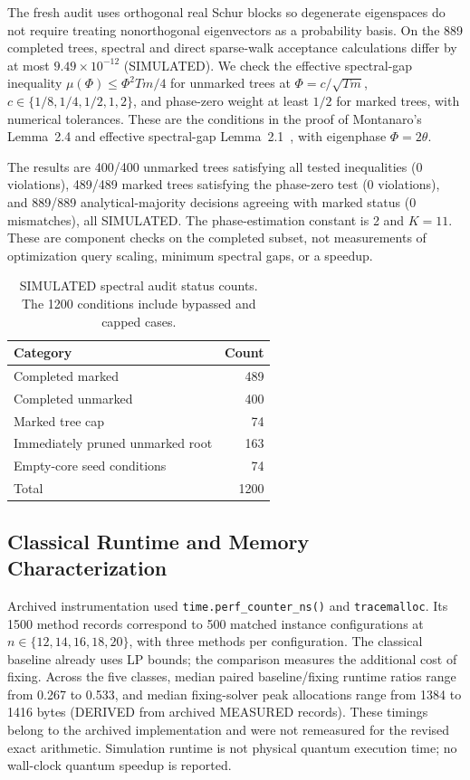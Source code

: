 \documentclass[pdflatex,sn-mathphys-num]{sn-jnl}
\begin{document}
The fresh audit uses orthogonal real Schur blocks so degenerate eigenspaces do not require treating nonorthogonal eigenvectors as a probability basis. On the 889 completed trees, spectral and direct sparse-walk acceptance calculations differ by at most $9.49\times10^{-12}$ (SIMULATED). We check the effective spectral-gap inequality $\mu(\Phi)\le\Phi^2Tm/4$ for unmarked trees at $\Phi=c/\sqrt{Tm}$, $c\in\{1/8,1/4,1/2,1,2\}$, and phase-zero weight at least $1/2$ for marked trees, with numerical tolerances. These are the conditions in the proof of Montanaro's Lemma~2.4 and effective spectral-gap Lemma~2.1~\cite{ref35}, with eigenphase $\Phi=2\theta$.

The results are 400/400 unmarked trees satisfying all tested inequalities (0 violations), 489/489 marked trees satisfying the phase-zero test (0 violations), and 889/889 analytical-majority decisions agreeing with marked status (0 mismatches), all SIMULATED. The phase-estimation constant is 2 and $K=11$. These are component checks on the completed subset, not measurements of optimization query scaling, minimum spectral gaps, or a speedup.

\begin{table}[t]
\caption{SIMULATED spectral audit status counts. The 1200 conditions include bypassed and capped cases.}
\label{tab:measured}
\centering
\begin{tabular}{lr}
\toprule
Category & Count \\
\midrule
Completed marked & 489 \\
Completed unmarked & 400 \\
Marked tree cap & 74 \\
Immediately pruned unmarked root & 163 \\
Empty-core seed conditions & 74 \\
\midrule
Total & 1200 \\
\bottomrule
\end{tabular}
\end{table}


\subsection{Classical Runtime and Memory Characterization}
Archived instrumentation used \texttt{time.perf\_counter\_ns()} and \texttt{tracemalloc}. Its 1500 method records correspond to 500 matched instance configurations at $n\in\{12,14,16,18,20\}$, with three methods per configuration. The classical baseline already uses LP bounds; the comparison measures the additional cost of fixing. Across the five classes, median paired baseline/fixing runtime ratios range from 0.267 to 0.533, and median fixing-solver peak allocations range from 1384 to 1416 bytes (DERIVED from archived MEASURED records). These timings belong to the archived implementation and were not remeasured for the revised exact arithmetic. Simulation runtime is not physical quantum execution time; no wall-clock quantum speedup is reported.
\end{document}
